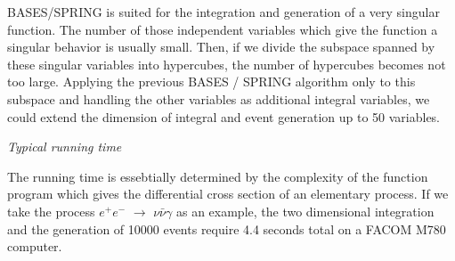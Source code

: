 {\par
\noindent
BASES/SPRING is suited for the integration and generation of a very
singular function.
The number of those independent variables which give the function a
singular behavior is usually small.
Then, if we divide the subspace spanned by these singular variables into
hypercubes, the number of hypercubes becomes not too large.
Applying the previous BASES / SPRING algorithm only to this subspace and
handling the other variables as additional integral variables, we could
extend the dimension of integral and event generation up to 50 variables.
\par
\smallskip
\noindent
{\it Typical running time}
\par
\noindent
The running time is essebtially determined by the complexity of the function
program which gives the differential cross section of an elementary process.
If we take the process ${e^+e^-}$ $\rightarrow$ ${\nu \bar{\nu} \gamma }$
as an example, the two dimensional integration and the generation of 10000
events require 4.4 seconds total on a FACOM M780
computer.
}
